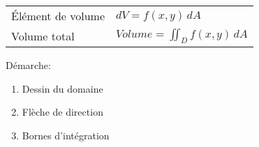 \begin{tabular}{ll}
    Élément de volume & \(dV=f(x,y) \,dA \) \\
    Volume total & \(Volume = \iint_D f(x,y) \,dA \)
\end{tabular}

Démarche:
\begin{enumerate}[nosep]
    \item Dessin du domaine
    \item Flèche de direction
    \item Bornes d'intégration
\end{enumerate}